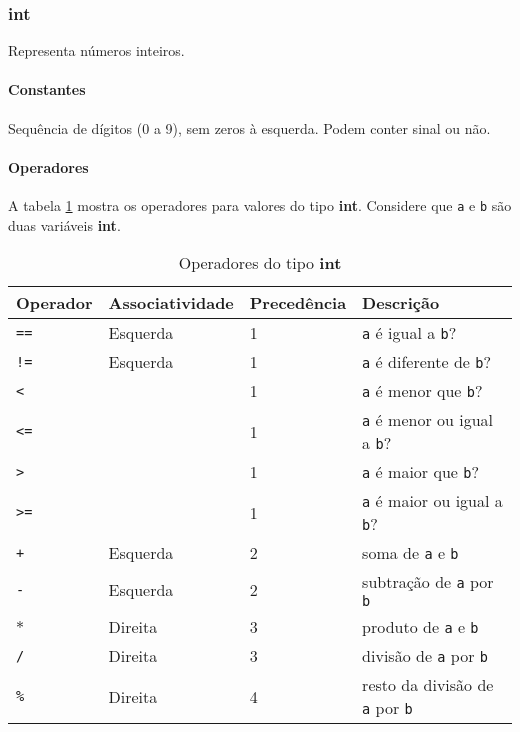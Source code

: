 \subsubsection{int}
Representa números inteiros.

\paragraph{Constantes} Sequência de dígitos (0 a 9), sem zeros à esquerda. Podem conter sinal ou não.

\paragraph{Operadores} A tabela \ref{tab:operadores-int} mostra os operadores para valores do tipo \textbf{int}. Considere que \texttt{a} e \texttt{b} são duas variáveis \textbf{int}.
\begin{table}[!h]
    \begin{tabular}{@{}llll@{}}
        \toprule
        Operador                 & Associatividade & Precedência & Descrição                                     \\ \midrule
        \texttt{==}              & Esquerda        & 1           & \texttt{a} é igual a \texttt{b}?              \\
        \texttt{!=}              & Esquerda        & 1           & \texttt{a} é diferente de \texttt{b}?         \\
        \texttt{\textless{}}     &                 & 1           & \texttt{a} é menor que \texttt{b}?            \\
        \texttt{\textless{}=}    &                 & 1           & \texttt{a} é menor ou igual a \texttt{b}?     \\
        \texttt{\textgreater{}}  &                 & 1           & \texttt{a} é maior que \texttt{b}?            \\
        \texttt{\textgreater{}=} &                 & 1           & \texttt{a} é maior ou igual a \texttt{b}?     \\
        \texttt{+}               & Esquerda        & 2           & soma de \texttt{a} e \texttt{b}               \\
        \texttt{-}               & Esquerda        & 2           & subtração de \texttt{a} por \texttt{b}        \\
        \texttt{$*$}             & Direita         & 3           & produto de \texttt{a} e \texttt{b}            \\
        \texttt{/}               & Direita         & 3           & divisão de \texttt{a} por \texttt{b}          \\
        \texttt{\%}              & Direita         & 4           & resto da divisão de \texttt{a} por \texttt{b}
    \end{tabular}
    \caption{Operadores do tipo \textbf{int}}
    \label{tab:operadores-int}
\end{table}

